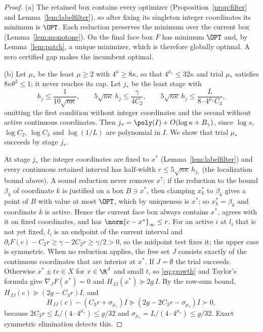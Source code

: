 \begin{proof}
(a) The retained box contains every optimizer
(Proposition~\ref{prop:filter} and Lemma~\ref{lem:labelfilter}), so after
fixing its singleton integer coordinates its minimum is $\OPT$. Each
reduction preserves the minimum over the current box
(Lemma~\ref{lem:monotone}). On the final face box $F$ has minimum $\OPT$ and,
by Lemma~\ref{lem:patch}, a unique minimizer, which is therefore globally
optimal. A zero certified gap makes the incumbent optimal.

(b) Let $\mu_*$ be the least $\mu\ge2$ with $4^\mu\ge8\kappa$, so that
$4^{\mu_*}\le32\kappa$ and trial $\mu_*$ satisfies $8\kappa\theta^2\le1$; it never reaches its cap. Let
$j_*$ be the least stage with
\[
h_j\le\frac1{10\sqrt{n\kappa}},\qquad
5\sqrt{n\kappa}\,h_j\le\frac\gamma{4C_2},\qquad
5\sqrt{n\kappa}\,h_j\le\frac L{8\cdot4^{\mu_*}C_3},
\]
omitting the first condition without integer coordinates and the second
without active continuous coordinates. Then
$j_*=\poly(I)+O(\log\kappa+B_\gamma)$, since $\log s$, $\log C_2$, $\log C_3$
and $\log(1/L)$ are polynomial in $I$. We show that trial $\mu_*$ succeeds by
stage $j_*$.

At stage $j_*$ the integer coordinates are fixed to $x^*$
(Lemma~\ref{lem:labelfilter}) and every continuous retained interval has
half-width $r\le5\sqrt{n\kappa}\,h_{j_*}$ (the localization bound above). A sound
reduction never removes $x^*$: if the reduction to the bound $\beta_k$ of
coordinate $k$ is justified on a box $B\ni x^*$, then clamping $x^*_k$ to
$\beta_k$ gives a point of $B$ with value at most $\OPT$, which by uniqueness is
$x^*$; so $x^*_k=\beta_k$ and coordinate $k$ is active. Hence the current
face box always contains $x^*$, agrees with it on fixed coordinates, and has
$\norm{c-x^*}_\infty\le r$. For an active $i$ at $l_i$ that is not yet fixed,
$l_i$ is an endpoint of the current interval and
$\partial_iF(c)-C_2r\ge\gamma-2C_2r\ge\gamma/2>0$, so the midpoint test
fixes it; the upper case is symmetric. When no reduction applies, the free
set $J$ consists exactly of the continuous coordinates that are interior at
$x^*$. If $J=\emptyset$ the trial succeeds. Otherwise $x^*\pm tv\in X$ for
$v\in\R^J$ and small $t$, so \eqref{eq:growth} and Taylor's formula give
$\nabla_JF(x^*)=0$ and $H_{JJ}(x^*)\succeq2g\,I$. By the row-sum
bound, $H_{JJ}(c)\succeq(2g-C_3r)I$, and
\[
H_{JJ}(c)-(C_3r+\sigma_{\mu_*})I\succeq(2g-2C_3r-\sigma_{\mu_*})I
\succ0,
\]
because $2C_3r\le L/(4\cdot4^{\mu_*})\le g/32$ and
$\sigma_{\mu_*}=L/(4\cdot4^{\mu_*})\le g/32$. Exact symmetric elimination
detects this.


\end{proof}
